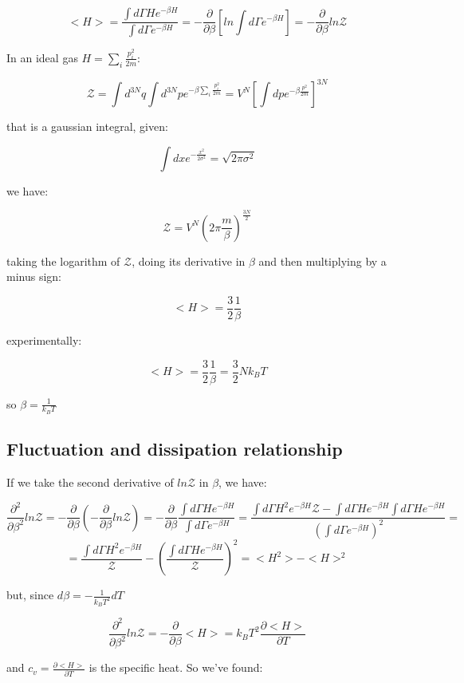\documentclass[a4paper, italian, openany]{book}
\begin{document}
$$<H> = \frac{\int d\Gamma H e^{-\beta H}}{\int d\Gamma e^{-\beta H}} = -\frac{\partial}{\partial \beta} \left [ ln \int d\Gamma e^{-\beta H} \right ] = -\frac{\partial}{\partial \beta} ln \mathcal{Z}$$

In an ideal gas $H = \sum_i \frac{p_i^2}{2m}$:

$$\mathcal{Z} = \int d^{3N} q \int d^{3N} p e^{- \beta \sum_i \frac{p_i^2}{2m}} = V^N \left [ \int dp e^{-\beta \frac{p^2}{2m} }\right ]^{3N}$$

that is a gaussian integral, given:

$$\int dx e^{-\frac{x^2}{2\sigma^2}} = \sqrt{2\pi \sigma^2}$$

we have:

$$\mathcal{Z} = V^N \left ( 2\pi \frac{m}{\beta} \right )^{\frac{3N}{2}}$$

taking the logarithm of $\mathcal{Z}$, doing its derivative in $\beta$ and then multiplying by a minus sign:

$$<H> = \frac{3}{2}\frac{1}{\beta}$$

experimentally:

$$<H> = \frac{3}{2}\frac{1}{\beta} = \frac{3}{2} N k_B T$$

so $\beta = \frac{1}{k_B T}$


\subsection{Fluctuation and dissipation relationship}

If we take the second derivative of $ln\mathcal{Z}$ in $\beta$, we have:

$$\frac{\partial^2}{\partial \beta^2} ln \mathcal{Z} = - \frac{\partial}{\partial \beta} \left ( -\frac{\partial}{\partial \beta} ln\mathcal{Z} \right ) = -\frac{\partial}{\partial \beta} \frac{\int d\Gamma H e^{-\beta H}}{\int d\Gamma e^{-\beta H}} = \frac{\int d\Gamma H^2 e^{-\beta H} \mathcal{Z} - \int d\Gamma H e^{-\beta H} \int d\Gamma H e^{-\beta H}}{\left ( \int d\Gamma e^{-\beta H} \right )^2} =$$
$$= \frac{\int d\Gamma H^2 e^{-\beta H}}{\mathcal{Z}} - \left (\frac{ \int d\Gamma H e^{-\beta H}}{\mathcal{Z}}\right )^2 = <H^2> - <H>^2$$

but, since $d\beta = -\frac{1}{k_B T^2} dT$

$$\frac{\partial^2}{\partial \beta^2} ln \mathcal{Z} = -\frac{\partial}{\partial \beta} <H> = k_B T^2 \frac{\partial <H>}{\partial T}$$

and $c_v = \frac{\partial <H>}{\partial T}$ is the specific heat. So we've found:
\end{document}
